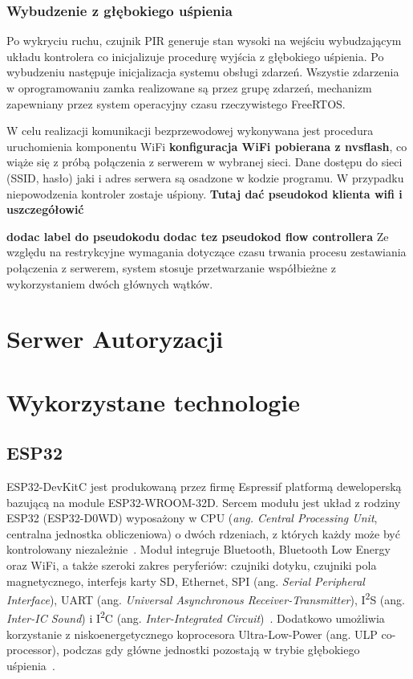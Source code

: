         \subsubsection{Wybudzenie z głębokiego uśpienia}

            Po wykryciu ruchu, czujnik PIR generuje stan wysoki na wejściu wybudzającym układu kontrolera co inicjalizuje procedurę wyjścia z głębokiego uśpienia. Po wybudzeniu następuje inicjalizacja systemu obsługi zdarzeń. Wszystie zdarzenia w oprogramowaniu zamka realizowane są przez grupę zdarzeń, mechanizm zapewniany przez system operacyjny czasu rzeczywistego FreeRTOS.

            W celu realizacji komunikacji bezprzewodowej wykonywana jest procedura uruchomienia komponentu WiFi \textbf{konfiguracja WiFi pobierana z nvsflash}, co wiąże się z próbą połączenia z serwerem w wybranej sieci. Dane dostępu do sieci (SSID, hasło) jaki i adres serwera są osadzone w kodzie programu. W przypadku niepowodzenia kontroler zostaje uśpiony. \textbf{Tutaj dać pseudokod klienta wifi i uszczegółowić}
            

            \textbf{dodac label do pseudokodu}
            \textbf{dodac tez pseudokod flow controllera}
            Ze względu na restrykcyjne wymagania dotyczące czasu trwania procesu zestawiania połączenia z serwerem, system stosuje przetwarzanie współbieżne z wykorzystaniem dwóch głównych wątków.

\section{Serwer Autoryzacji}

\section {Wykorzystane technologie}

    \subsection{ESP32}

        ESP32-DevKitC jest produkowaną przez firmę Espressif platformą deweloperską bazującą na module ESP32-WROOM-32D. Sercem modułu jest układ z rodziny ESP32 (ESP32-D0WD) wyposażony w CPU (\textit{ang. Central Processing Unit}, centralna jednostka obliczeniowa) o dwóch rdzeniach, z których każdy może być kontrolowany niezależnie~\cite{esp32-wroom32-ds}. Moduł integruje Bluetooth, Bluetooth Low Energy oraz WiFi, a także szeroki zakres peryferiów: czujniki dotyku, czujniki pola magnetycznego, interfejs karty SD, Ethernet, SPI (ang. \textit{Serial Peripheral Interface}), UART (ang. \textit{Universal Asynchronous Receiver-Transmitter}), I\textsuperscript{2}S (ang. \textit{Inter-IC Sound}) i I\textsuperscript{2}C (ang. \textit{Inter-Integrated Circuit})~\cite{esp32-wroom32-ds}. Dodatkowo umożliwia korzystanie z niskoenergetycznego koprocesora Ultra-Low-Power (ang. ULP co-processor), podczas gdy główne jednostki pozostają w trybie głębokiego uśpienia~\cite{esp32-tech-ref-man}.

